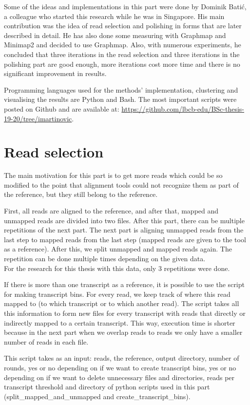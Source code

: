 \documentclass[times, utf8, zavrsni, numeric]{fer}
\begin{document}
Some of the ideas and implementations in this part were done by Dominik Batić, a colleague
who started this research while he was in Singapore. His main contribution was the idea 
of read selection and polishing in forms that are later described in detail. He has also done some
measuring with Graphmap and Minimap2 and decided to use Graphmap. Also, with numerous 
experiments, he concluded that three iterations in the read selection and three iterations in
the polishing part are good enough, more iterations cost more time and there is no
significant improvement in results. 

Programming languages used for the methods' implementation, clustering and visualising the
results are Python and Bash. The most important scripts were posted on Github and are 
available at: \url{https://github.com/lbcb-edu/BSc-thesis-19-20/tree/imartinovic}.

\section{Read selection}
The main motivation for this part is to get more reads which could be so modified to the point that
alignment tools could not recognize them as part of the reference, but they still belong
to the reference.

First, all reads are aligned to the reference, and after that, mapped and unmapped reads 
are divided into two files. After this part, there can be multiple repetitions of the next part. 
The next part is aligning unmapped reads from the last step to mapped reads from the last step (mapped reads are
given to the tool as a reference). After this, we split unmapped and mapped reads again.
The repetition can be done multiple times depending on the given data. \\
For the research for this thesis with this data, only 3 repetitions were done.

If there is more than one transcript as a reference, it is possible to use the script for
making transcript bins. For every read, we keep track of where this read mapped to
(to which transcript or to which another read). The script takes all this information to
form new files for every transcript with reads that directly or indirectly mapped to a certain transcript.
This way, execution time is shorter because in the next part when we overlap reads to 
reads we only have a smaller number of reads in each file.

This script takes as an input: reads, the reference, output directory, number of rounds, 
yes or no depending on if we want to create transcript bins, yes or no depending on if
we want to delete unnecessary files and directories, reads per transcript threshold and
directory of python scripts used in this part (split\_mapped\_and\_unmapped and create\_transcript\_bins).
\end{document}
